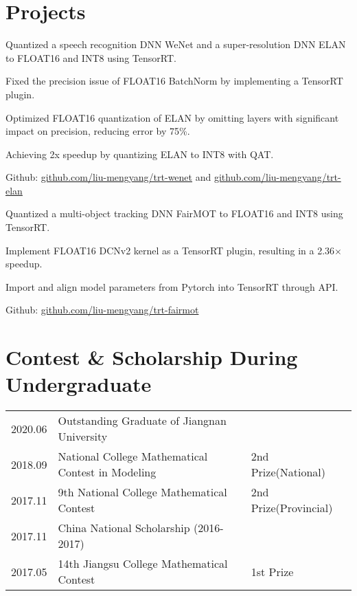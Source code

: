 \documentclass[]{deedy-resume-openfont}
\begin{document}
\begin{minipage}[t]{0.77\textwidth}
\section{Projects}
\begin{tightemize}
    \item Quantized a speech recognition DNN WeNet and a super-resolution DNN ELAN to FLOAT16 and INT8 using TensorRT.
    \item Fixed the precision issue of FLOAT16 BatchNorm by implementing a TensorRT plugin.
    \item Optimized FLOAT16 quantization of ELAN by omitting layers with significant impact on precision, reducing error by 75\%.
    \item Achieving 2x speedup by quantizing ELAN to INT8 with QAT.
    \item Github: \href{https://github.com/liu-mengyang/trt-wenet}{github.com/liu-mengyang/trt-wenet} and \href{https://github.com/liu-mengyang/trt-elan}{github.com/liu-mengyang/trt-elan}
\end{tightemize}
\sectionsep

\begin{tightemize}
    \item Quantized a multi-object tracking DNN FairMOT to FLOAT16 and INT8 using TensorRT.
    \item Implement FLOAT16 DCNv2 kernel as a TensorRT plugin, resulting in a 2.36$\times$ speedup.
    \item Import and align model parameters from Pytorch into TensorRT through API.
    \item Github: \href{https://github.com/liu-mengyang/trt-fairmot}{github.com/liu-mengyang/trt-fairmot}
\end{tightemize}
\sectionsep

\section{Contest \& Scholarship During Undergraduate} 
\begin{tabular}{lll}
    2020.06 & Outstanding Graduate of Jiangnan University & \\
    2018.09 & National College Mathematical Contest in Modeling & 2nd Prize(National) \\
    2017.11 & 9th National College Mathematical Contest & 2nd Prize(Provincial) \\
    2017.11 & China National Scholarship (2016-2017) & \\
    2017.05 & 14th Jiangsu College Mathematical Contest & 1st Prize\\
\end{tabular}
\sectionsep

\end{minipage} 
\end{document}

